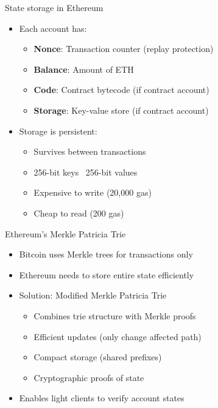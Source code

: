 \documentclass[aspectratio=169, lualatex, handout]{beamer}
\begin{document}
\begin{frame}{State storage in Ethereum}
	\begin{itemize}
		\item Each account has:
		      \begin{itemize}
			      \item \textbf{Nonce}: Transaction counter (replay protection)
			      \item \textbf{Balance}: Amount of ETH
			      \item \textbf{Code}: Contract bytecode (if contract account)
			      \item \textbf{Storage}: Key-value store (if contract account)
		      \end{itemize}
		\item Storage is persistent:
		      \begin{itemize}
			      \item Survives between transactions
			      \item 256-bit keys \rightarrow\ 256-bit values
			      \item Expensive to write (20,000 gas)
			      \item Cheap to read (200 gas)
		      \end{itemize}
	\end{itemize}
\end{frame}

\begin{frame}{Ethereum's Merkle Patricia Trie}
	\begin{itemize}
		\item Bitcoin uses Merkle trees for transactions only
		\item Ethereum needs to store entire state efficiently
		\item Solution: Modified Merkle Patricia Trie
		      \begin{itemize}
			      \item Combines trie structure with Merkle proofs
			      \item Efficient updates (only change affected path)
			      \item Compact storage (shared prefixes)
			      \item Cryptographic proofs of state
		      \end{itemize}
		\item Enables light clients to verify account states
	\end{itemize}
\end{frame}
\end{document}
